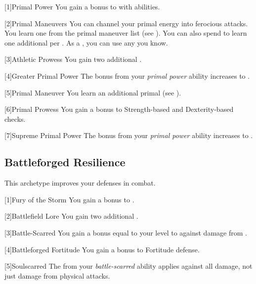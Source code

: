        [1]{Primal Power} You gain a  bonus to  with  abilities.

        [2]{Primal Maneuvers}
        You can channel your primal energy into ferocious attacks.
        You learn one  from the primal maneuver list (see ).
        You can also spend  to learn one additional  per .
        As a , you can use any  you know.

        [3]{Athletic Prowess} You gain two additional .

        [4]{Greater Primal Power} The bonus from your \textit{primal power} ability increases to .

        [5]{Primal Maneuver}
        You learn an additional primal  (see ).

        [6]{Primal Prowess}
        You gain a  bonus to Strength-based and Dexterity-based checks.

        [7]{Supreme Primal Power}
        The bonus from your \textit{primal power} ability increases to .

    \subsection{Battleforged Resilience}
        This archetype improves your defenses in combat.

        [1]{Fury of the Storm} You gain a  bonus to .

        [2]{Battlefield Lore} You gain two additional .

        [3]{Battle-Scarred} You gain a bonus equal to your level to  against damage from .

        [4]{Battleforged Fortitude} You gain a  bonus to Fortitude defense.

        [5]{Soulscarred} The  from your \textit{battle-scarred} ability applies against all damage, not just damage from physical attacks.

